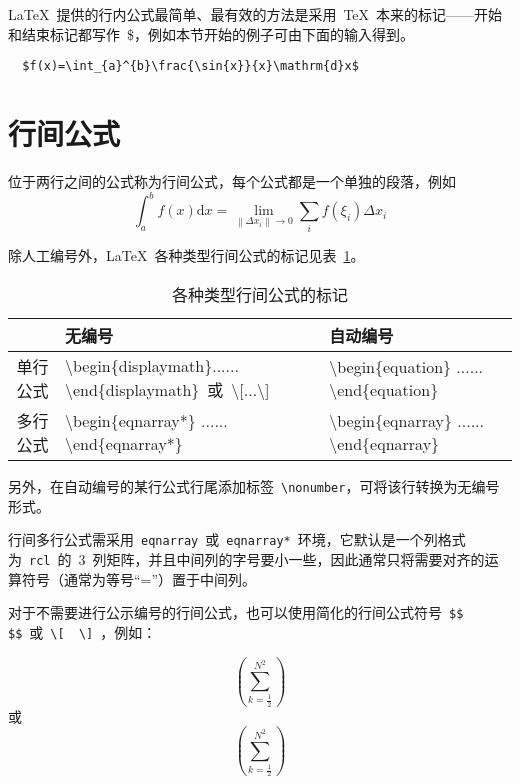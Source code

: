 \LaTeX~提供的行内公式最简单、最有效的方法是采用~\TeX~本来的标记——开始和结束标记都写作~\$，例如本节开始的例子可由下面的输入得到。
\begin{lstlisting}
  $f(x)=\int_{a}^{b}\frac{\sin{x}}{x}\mathrm{d}x$
\end{lstlisting}

\section{行间公式}

位于两行之间的公式称为行间公式，每个公式都是一个单独的段落，例如
\[\int_a^b{f\left(x\right)\mathrm{d}x}=\lim_{\left\|\Delta{x_i}\right\|\to 0}\sum_i{f\left(\xi_i\right)\Delta{x_i}}\]

除人工编号外，\LaTeX~各种类型行间公式的标记见表~\ref{eqtag}。
\begin{table}[htbp]
  \caption{各种类型行间公式的标记}
  \label{eqtag}
  \vspace{0.5em}\centering\wuhao
  \begin{tabularx}{0.9\textwidth}{cXX}
    \toprule
             & 无编号                                                                                                             & 自动编号                                                               \\\midrule
    单行公式 & \textbackslash begin\{displaymath\}...... \textbackslash end\{displaymath\}~或~\textbackslash [...\textbackslash ] & \textbackslash begin\{equation\} ...... \textbackslash end\{equation\} \\
    多行公式 & \textbackslash begin\{eqnarray*\} ...... \textbackslash end\{eqnarray*\}                                           & \textbackslash begin\{eqnarray\} ...... \textbackslash end\{eqnarray\} \\
    \bottomrule
  \end{tabularx}
\end{table}

另外，在自动编号的某行公式行尾添加标签~\verb|\nonumber|，可将该行转换为无编号形式。

行间多行公式需采用~\verb|eqnarray|~或~\verb|eqnarray*|~环境，它默认是一个列格式为~\verb|rcl|~的~3~列矩阵，并且中间列的字号要小一些，因此通常只将需要对齐的运算符号（通常为等号“=”）置于中间列。

对于不需要进行公示编号的行间公式，也可以使用简化的行间公式符号~\verb|$$  $$|~或~\verb|\[  \]|~，例如：

$$(\sum_{k=\frac12}^{N^2})$$
或
\[(\sum_{k=\frac12}^{N^2})\]

